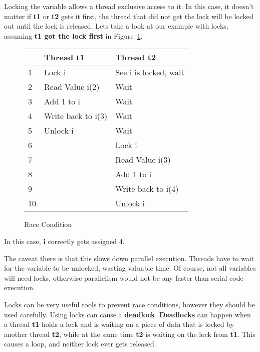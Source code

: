 \documentclass[letterpaper, 11pt]{article}
\begin{document}
Locking the variable allows a thread exclusive access to it. In this case, it doesn't
matter if {\bfseries t1} or {\bfseries t2} gets it first, the thread that did
not get the lock will be locked out until the lock is released. Lets take a
look at our example with locks, assuming {\bfseries t1 got the lock first} in 
Figure~\ref{fig:race_cond_4}.

\begin{figure}[h]
\centering
\begin{tabular}{|l|l|l|}
	\hline
	& {\bfseries Thread t1} & {\bfseries Thread t2} \\
	\hline
	1 & Lock i & See i is locked, wait \\
	\hline
	2 & Read Value i(2) & Wait\\
	\hline
	3 & Add 1 to i & Wait \\
	\hline
	4 & Write back to i(3) & Wait \\
	\hline
	5 & Unlock i & Wait \\
	\hline
	6 &  & Lock i \\
	\hline
	7 & & Read Value i(3)\\
	\hline
	8 & & Add 1 to i \\
	\hline
	9 & & Write back to i(4) \\
	\hline
	10 & & Unlock i\\
	\hline
\end{tabular}
\caption{Race Condition}
\label{fig:race_cond_4}
\end{figure}

In this case, {\bfseries i} correctly gets assigned 4.
\par\vspace{\baselineskip}

The caveat there is that this slows down parallel execution. Threads have to wait for
the variable to be unlocked, wasting valuable time. Of course, not all variables
will need locks, otherwise parallelism would not be any faster than serial code execution.
\par\vspace{\baselineskip}

Locks can be very useful tools to prevent race conditions, however they should be used carefully.
Using locks can cause a {\bfseries deadlock}. {\bfseries Deadlocks} can happen when a thread
{\bfseries t1} holds a lock and is waiting on a piece of data that is locked by another thread
{\bfseries t2}, while at the same time {\bfseries t2} is waiting on the lock from {\bfseries t1}.
This causes a loop, and neither lock ever gets released.
\par\vspace{\baselineskip}
\end{document}
